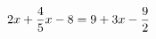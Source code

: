 \documentclass[preview]{standalone}
\begin{document}
\begin{align*}
\special{dvisvgm:raw <g id='unique000'>}2x + \frac{4}{5}x - 8 = 9 + 3x - \frac{9}{2}\special{dvisvgm:raw </g>}
\end{align*}
\end{document}
